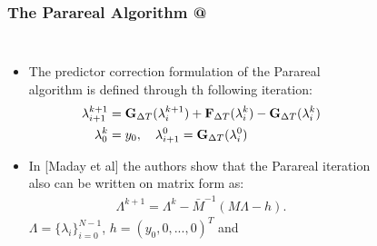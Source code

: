\documentclass[9pt]{beamer}
\makeatletter
\newcommand*{\rom}[1]{\expandafter\@slowromancap\romannumeral #1@}
\makeatother
\begin{document}
\begin{frame}
\frametitle{The Parareal Algorithm \rom{2}}
\begin{columns}
\begin{itemize}
\item{The predictor correction formulation of the Parareal algorithm is defined through th following iteration:
{\small \begin{align*}
\lambda_{i+1}^{k+1} &= \bold{G}_{\Delta T}(\lambda_{i}^{k+1})+\bold{F}_{\Delta T}(\lambda_{i}^{k})-\bold{G}_{\Delta T}(\lambda_{i}^{k}) \\
\lambda_0^k&=y_0,\quad \lambda_{i+1}^0 = \bold{G}_{\Delta T}(\lambda_{i}^{0})
\end{align*}}}
\item{In [Maday et al] the authors show that the Parareal iteration also can be written on matrix form as:
{\small \begin{align*}
\Lambda^{k+1} = \Lambda^k -\bar M^{-1}(M\Lambda-h).
\end{align*}}
$\Lambda=\{\lambda_i\}_{i=0}^{N-1}$, $h=(y_0,0,...,0)^T$ and
}
\end{itemize}
\begin{figure}

\end{figure}
\end{columns}
\end{frame}
\end{document}
